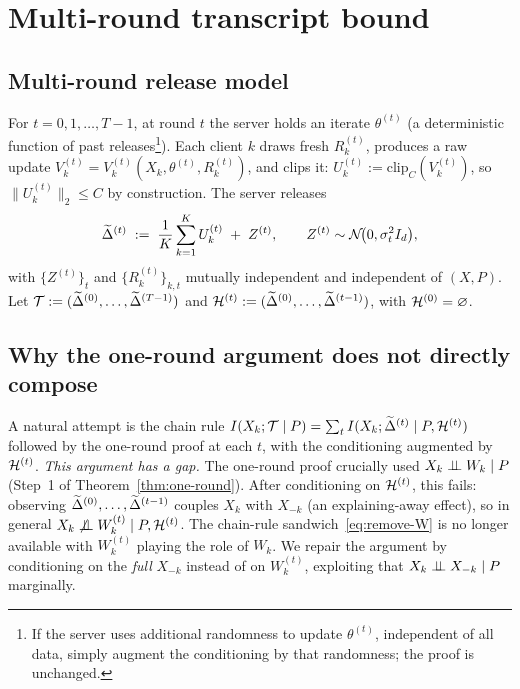 \section{Multi-round transcript bound}\label{sec:multi-round}

\subsection{Multi-round release model}\label{sec:multi-setup}
For \(t=0,1,\dots,T-1\), at round \(t\) the server holds an iterate \(\theta^{(t)}\) (a deterministic function of past releases\footnote{If the server uses additional randomness to update \(\theta^{(t)}\), independent of all data, simply augment the conditioning by that randomness; the proof is unchanged.}). Each client \(k\) draws fresh \(R_k^{(t)}\), produces a raw update \(V_k^{(t)}=V_k^{(t)}(X_k,\theta^{(t)},R_k^{(t)})\), and clips it: \(U_k^{(t)} := \mathrm{clip}_C(V_k^{(t)})\), so \(\|U_k^{(t)}\|_2\le C\) by construction. The server releases
\begin{equation}\label{eq:release-t}
\widetilde{\Delta}^{(t)} \;:=\; \frac{1}{K}\sum_{k=1}^{K}U_k^{(t)} \;+\; Z^{(t)}, \qquad Z^{(t)}\sim\mathcal{N}\!\bigl(0,\sigma_t^2 I_d\bigr),
\end{equation}
with \(\{Z^{(t)}\}_t\) and \(\{R_k^{(t)}\}_{k,t}\) mutually independent and independent of \((X,P)\). Let \(\mathcal{T}:=(\widetilde{\Delta}^{(0)},\dots,\widetilde{\Delta}^{(T-1)})\) and \(\mathcal{H}^{(t)}:=(\widetilde{\Delta}^{(0)},\dots,\widetilde{\Delta}^{(t-1)})\), with \(\mathcal{H}^{(0)}=\varnothing\).

\subsection{Why the one-round argument does not directly compose}\label{sec:gap}
A natural attempt is the chain rule
\(I(X_k;\mathcal{T}\mid P) = \sum_t I(X_k;\widetilde{\Delta}^{(t)}\mid P,\mathcal{H}^{(t)})\) followed by the one-round proof at each \(t\), with the conditioning augmented by \(\mathcal{H}^{(t)}\). \emph{This argument has a gap.}
The one-round proof crucially used \(X_k\perp\!\!\!\perp W_k\mid P\) (Step~1 of Theorem~\ref{thm:one-round}). After conditioning on \(\mathcal{H}^{(t)}\), this fails: observing \(\widetilde{\Delta}^{(0)},\dots,\widetilde{\Delta}^{(t-1)}\) couples \(X_k\) with \(X_{-k}\) (an explaining-away effect), so in general
\(X_k\not\perp\!\!\!\perp W_k^{(t)}\mid P,\mathcal{H}^{(t)}\). The chain-rule sandwich~\eqref{eq:remove-W} is no longer available with \(W_k^{(t)}\) playing the role of \(W_k\). We repair the argument by conditioning on the \emph{full} \(X_{-k}\) instead of on \(W_k^{(t)}\), exploiting that \(X_k\perp\!\!\!\perp X_{-k}\mid P\) marginally.

